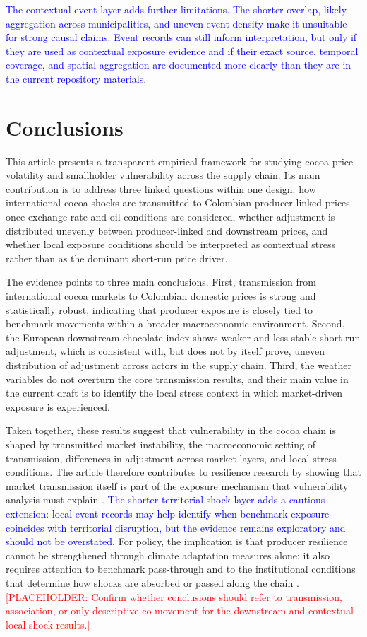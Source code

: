 \documentclass[11pt]{article}
\newcommand{\vTwo}[1]{\textcolor{blue}{#1}}
\newcommand{\placeholder}[1]{\textcolor{red}{[PLACEHOLDER: #1]}}
\begin{document}
\vTwo{The contextual event layer adds further limitations. The shorter overlap, likely aggregation across municipalities, and uneven event density make it unsuitable for strong causal claims. Event records can still inform interpretation, but only if they are used as contextual exposure evidence and if their exact source, temporal coverage, and spatial aggregation are documented more clearly than they are in the current repository materials.}

\section{Conclusions}
\label{sec:conclusion}

This article presents a transparent empirical framework for studying cocoa price volatility and smallholder vulnerability across the supply chain. Its main contribution is to address three linked questions within one design: how international cocoa shocks are transmitted to Colombian producer-linked prices once exchange-rate and oil conditions are considered, whether adjustment is distributed unevenly between producer-linked and downstream prices, and whether local exposure conditions should be interpreted as contextual stress rather than as the dominant short-run price driver.

The evidence points to three main conclusions. First, transmission from international cocoa markets to Colombian domestic prices is strong and statistically robust, indicating that producer exposure is closely tied to benchmark movements within a broader macroeconomic environment. Second, the European downstream chocolate index shows weaker and less stable short-run adjustment, which is consistent with, but does not by itself prove, uneven distribution of adjustment across actors in the supply chain. Third, the weather variables do not overturn the core transmission results, and their main value in the current draft is to identify the local stress context in which market-driven exposure is experienced.

Taken together, these results suggest that vulnerability in the cocoa chain is shaped by transmitted market instability, the macroeconomic setting of transmission, differences in adjustment across market layers, and local stress conditions. The article therefore contributes to resilience research by showing that market transmission itself is part of the exposure mechanism that vulnerability analysis must explain \citep{Turner2003,Adger2006}. \vTwo{The shorter territorial shock layer adds a cautious extension: local event records may help identify when benchmark exposure coincides with territorial disruption, but the evidence remains exploratory and should not be overstated.} For policy, the implication is that producer resilience cannot be strengthened through climate adaptation measures alone; it also requires attention to benchmark pass-through and to the institutional conditions that determine how shocks are absorbed or passed along the chain \citep{Gereffi2005,Merkle2021}. \placeholder{Confirm whether conclusions should refer to transmission, association, or only descriptive co-movement for the downstream and contextual local-shock results.}
\end{document}
